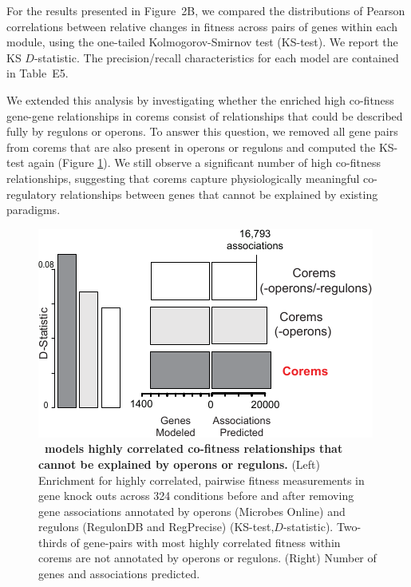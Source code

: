 For the results presented in Figure~2B, we compared the distributions
of Pearson correlations between relative changes in fitness across
pairs of genes within each module, using the one-tailed
Kolmogorov-Smirnov test (KS-test). We report the KS $D$-statistic. The
precision/recall characteristics for each model are contained in Table~E5.

We extended this analysis by investigating whether the enriched high
co-fitness gene-gene relationships in corems consist of relationships
that could be described fully by regulons or operons. To answer this
question, we removed all gene pairs from corems that are also present
in operons or regulons and computed the KS-test again (Figure
\ref{fig:fitness_wo_operons}). We still observe a significant number
of high co-fitness relationships, suggesting that corems capture
physiologically meaningful co-regulatory relationships between genes
that cannot be explained by existing paradigms.

\begin{figure}[hp]
\centering
\includegraphics[width=0.6\linewidth]{figures/fitness_wo_operons.pdf}
\caption[\egrine~models highly correlated co-fitness relationships
  that cannot be explained by operons or
  regulons]{\textbf{\egrine~models highly correlated co-fitness
    relationships that cannot be explained by operons or regulons.}
  (Left) Enrichment for highly correlated, pairwise fitness
  measurements in gene knock outs across 324 conditions before and
  after removing gene associations annotated by operons
  (Microbes Online) and regulons (RegulonDB and RegPrecise)
  (KS-test,$D$-statistic). Two-thirds of gene-pairs with most highly
  correlated fitness within corems are not annotated by operons or
  regulons. (Right) Number of genes and associations predicted.}
\label{fig:fitness_wo_operons}
\end{figure}
